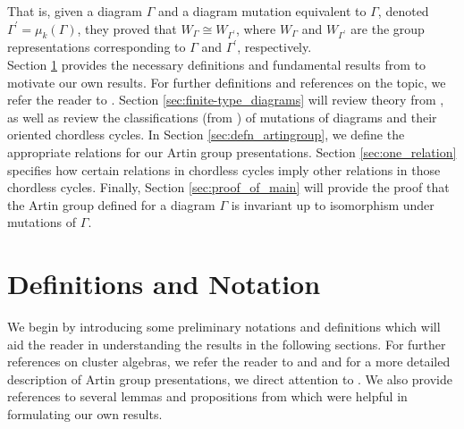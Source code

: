 \documentclass[11pt]{amsart}
\theoremstyle{definition}
\begin{document}
That is, given a diagram $\Gamma$ and a diagram mutation equivalent to $\Gamma$, denoted $\Gamma^{\prime} = \mu_k(\Gamma)$, they proved that $W_{\Gamma} \cong W_{\Gamma^{\prime}}$, where $W_{\Gamma}$ and $W_{\Gamma^{\prime}}$ are the group representations corresponding to $\Gamma$ and $\Gamma^{\prime}$, respectively. \\

\indent Section \ref{sec:main_definitions} provides the necessary definitions and fundamental results from \cite{BM13} to motivate our own results. For further definitions and references on the topic, we refer the reader to \cite{FZ02}. Section \ref{sec:finite-type_diagrams}  will review theory from \cite{FZ02}, \cite{FZ03} as well as review the classifications (from \cite{BM13}) of mutations of diagrams and their oriented chordless cycles. In Section \ref{sec:defn_artingroup}, we define the appropriate relations for our Artin group presentations. Section \ref{sec:one_relation} specifies how certain relations in chordless cycles imply other relations in those chordless cycles. Finally, Section \ref{sec:proof_of_main} will provide the proof that the Artin group defined for a diagram $\Gamma$ is invariant up to isomorphism under mutations of $\Gamma$. \\

\section{Definitions and Notation}
\label{sec:main_definitions}

We begin by introducing some preliminary notations and definitions which will aid the reader in understanding the results in the following sections. For further references on cluster algebras, we refer the reader to \cite{FZ02} and \cite{FZ03} and for a more detailed description of Artin group presentations, we direct attention to \cite{FN61}. We also provide references to several lemmas and propositions from \cite{BM13} which were helpful in formulating our own results. \\
\end{document}
